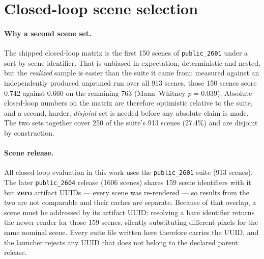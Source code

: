 %
%
%

\section{Closed-loop scene selection}
\label{app:hard100}

\paragraph{Why a second scene set.}
The shipped closed-loop matrix is the first 150 scenes of \texttt{public\_2601}
under a sort by scene identifier. That is unbiased in expectation, deterministic and
nested, but the \emph{realized} sample is easier than the suite it came from: measured
against an independently produced unpruned run over all 913 scenes, those
150 scenes score 0.742 against 0.660 on
the remaining 763 (Mann--Whitney $p=0.039$). Absolute closed-loop
numbers on the matrix are therefore optimistic relative to the suite, and a second,
harder, \emph{disjoint} set is needed before any absolute claim is made. The two sets
together cover 250 of the suite's 913 scenes
(27.4\%) and are disjoint by construction.

\paragraph{Scene release.}
All closed-loop evaluation in this work uses the \texttt{public\_2601} suite
(913 scenes). The later \texttt{public\_2604} release (1606 scenes) shares
159 scene identifiers with it but \textbf{zero} artifact UUIDs --- every scene was
re-rendered --- so results from the two are not comparable and their caches are separate.
Because of that overlap, a scene must be addressed by its artifact UUID: resolving a bare
identifier returns the newer render for those 159 scenes, silently substituting
different pixels for the same nominal scene. Every suite file written here therefore
carries the UUID, and the launcher rejects any UUID that does not belong to the declared
parent release.

